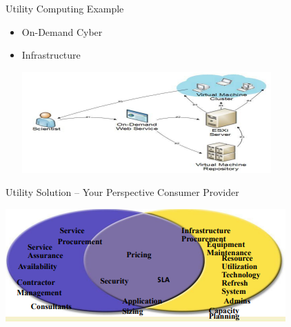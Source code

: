 \documentclass{SKP-beamer}
\begin{document}
\begin{frame}{Utility Computing Example}
	\begin{itemize}
		
		\item On-Demand Cyber
		\item Infrastructure
		
			\includegraphics[scale=1.5]{9.png}
		
		
		
	\end{itemize}
\end{frame}

\begin{frame}{Utility Solution – Your 
		Perspective Consumer Provider}
	
		
		\includegraphics[scale=1.5]{10.png}
		
		
		

\end{frame}
\end{document}
